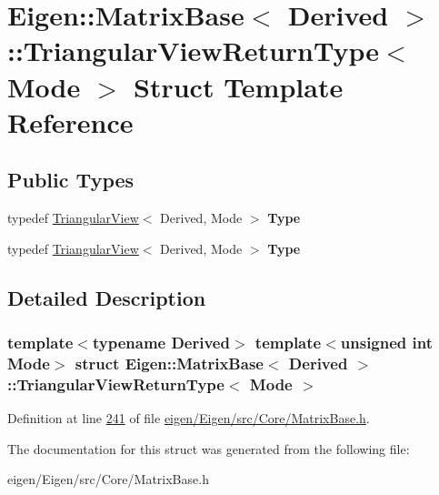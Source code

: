\hypertarget{struct_eigen_1_1_matrix_base_1_1_triangular_view_return_type}{}\section{Eigen\+:\+:Matrix\+Base$<$ Derived $>$\+:\+:Triangular\+View\+Return\+Type$<$ Mode $>$ Struct Template Reference}
\label{struct_eigen_1_1_matrix_base_1_1_triangular_view_return_type}
\subsection*{Public Types}
\begin{DoxyCompactItemize}
\item 
\mbox{\label{struct_eigen_1_1_matrix_base_1_1_triangular_view_return_type_a12df3e7a526bab6affc069db34ce4b69}} 
typedef \hyperlink{group___core___module_class_eigen_1_1_triangular_view}{Triangular\+View}$<$ Derived, Mode $>$ {\bfseries Type}
\item 
\mbox{\label{struct_eigen_1_1_matrix_base_1_1_triangular_view_return_type_a12df3e7a526bab6affc069db34ce4b69}} 
typedef \hyperlink{group___core___module_class_eigen_1_1_triangular_view}{Triangular\+View}$<$ Derived, Mode $>$ {\bfseries Type}
\end{DoxyCompactItemize}


\subsection{Detailed Description}
\subsubsection*{template$<$typename Derived$>$\newline
template$<$unsigned int Mode$>$\newline
struct Eigen\+::\+Matrix\+Base$<$ Derived $>$\+::\+Triangular\+View\+Return\+Type$<$ Mode $>$}



Definition at line \hyperlink{eigen_2_eigen_2src_2_core_2_matrix_base_8h_source_l00241}{241} of file \hyperlink{eigen_2_eigen_2src_2_core_2_matrix_base_8h_source}{eigen/\+Eigen/src/\+Core/\+Matrix\+Base.\+h}.



The documentation for this struct was generated from the following file\+:\begin{DoxyCompactItemize}
\item 
eigen/\+Eigen/src/\+Core/\+Matrix\+Base.\+h\end{DoxyCompactItemize}
